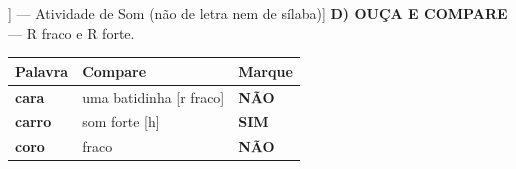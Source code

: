 \begin{exercicio}[Som /r/ fraco [[r]] --- Atividade de Som (não de letra nem de sílaba)]
\textbf{D) OUÇA E COMPARE} --- R fraco e R forte.

\begin{center}
\begin{tabular}{@{}p{4.2cm}p{6.2cm}p{1.6cm}@{}}
\hline
\textbf{Palavra} & \textbf{Compare} & \textbf{Marque} \\
\hline
\textbf{cara} & uma batidinha [r fraco] & \textbf{NÃO} \\
\textbf{carro} & som forte [h] & \textbf{SIM} \\
\textbf{coro} & fraco & \textbf{NÃO} \\
\hline
\end{tabular}
\end{center}

\end{exercicio}

